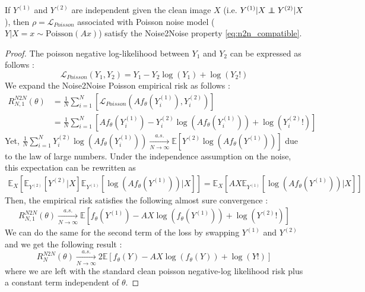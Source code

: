 \begin{proposition}
    \label{prop:noise2noise_poisson}
    If $Y^{(1)}$ and $Y^{(2)}$ are independent given the clean image $X$ (i.e. $Y^{(1)} | X \independent Y^{(2)} | X$), then $\rho = \mathcal{L}_{Poisson}$ associated with Poisson noise model ($Y | X=x \sim \text{Poisson}(Ax)$) satisfy the Noise2Noise property \eqref{eq:n2n_compatible}.
\end{proposition}

\begin{proof}
    The poisson negative log-likelihood between $Y_1$ and $Y_2$ can be expressed as follows :
    \begin{equation*}
        \mathcal{L}_{Poisson}(Y_1, Y_2) = Y_1 - Y_2 \log(Y_1) + \log(Y_2!)
    \end{equation*}
    We expand the Noise2Noise Poisson empirical risk as follows :
    \begin{align*}
        R_{N,1}^{N2N}(\theta) &= \frac{1}{N} \sum_{i=1}^N \left[ \mathcal{L}_{Poisson}(Af_\theta(Y_i^{(1)}), Y_i^{(2)}) \right] \\
        &= \frac{1}{N} \sum_{i=1}^N \left[ Af_\theta(Y_i^{(1)}) - Y_i^{(2)} \log(Af_\theta(Y_i^{(1)})) + \log(Y_i^{(2)}!) \right]
    \end{align*}
    Yet, $\frac{1}{N} \sum_{i=1}^N Y_i^{(2)} \log(Af_\theta(Y_i^{(1)})) \xrightarrow[N \to \infty]{a.s.} \mathbb{E} \left[ Y^{(2)} \log(Af_\theta(Y^{(1)})) \right]$ due to the law of large numbers. Under the independence assumption on the noise, this expectation can be rewritten as 
    \begin{align*}
        \mathbb{E}_X \left[ \mathbb{E}_{Y^{(2)}} \left[ Y^{(2)} | X \right] \mathbb{E}_{Y^{(1)}} \left[ \log(Af_\theta(Y^{(1)})) | X \right] \right] = \mathbb{E}_X \left[ AX \mathbb{E}_{Y^{(1)}} \left[ \log(Af_\theta(Y^{(1)})) | X \right] \right]
    \end{align*}
    Then, the empirical risk satisfies the following almost sure convergence :
    \begin{align*}
        R_{N,1}^{N2N}(\theta) \xrightarrow[N \to \infty]{a.s.} \mathbb{E} \left[ f_\theta(Y^{(1)}) - AX \log(f_\theta(Y^{(1)})) + \log(Y^{(2)}!) \right]
    \end{align*}
    We can do the same for the second term of the loss by swapping $Y^{(1)}$ and $Y^{(2)}$ and we get the following result :
    \begin{equation*}
        R_{N}^{N2N}(\theta) \xrightarrow[N \to \infty]{a.s.} 2 \mathbb{E} \left[ f_\theta(Y) - AX \log(f_\theta(Y)) + \log(Y!)\right]
    \end{equation*}
    where we are left with the standard clean poisson negative-log likelihood risk plus a constant term independent of $\theta$.
\end{proof}


